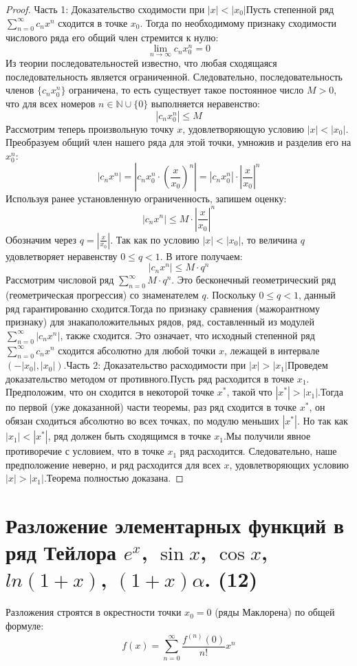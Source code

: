 \documentclass[14pt]{extreport}
\begin{document}
    \begin{proof}
        Часть 1: Доказательство сходимости при $|x| < |x_0|$Пусть степенной ряд $\sum_{n=0}^{\infty} c_n x^n$ сходится в точке $x_0$. Тогда по необходимому признаку сходимости числового ряда его общий член стремится к нулю:$$\lim_{n \to \infty} c_n x_0^n = 0$$Из теории последовательностей известно, что любая сходящаяся последовательность является ограниченной. Следовательно, последовательность членов $\{c_n x_0^n\}$ ограничена, то есть существует такое постоянное число $M > 0$, что для всех номеров $n \in \mathbb{N} \cup \{0\}$ выполняется неравенство:$$|c_n x_0^n| \le M$$Рассмотрим теперь произвольную точку $x$, удовлетворяющую условию $|x| < |x_0|$. Преобразуем общий член нашего ряда для этой точки, умножив и разделив его на $x_0^n$:$$|c_n x^n| = \left| c_n x_0^n \cdot \left(\frac{x}{x_0}\right)^n \right| = |c_n x_0^n| \cdot \left| \frac{x}{x_0} \right|^n$$Используя ранее установленную ограниченность, запишем оценку:$$|c_n x^n| \le M \cdot \left| \frac{x}{x_0} \right|^n$$Обозначим через $q = \left| \frac{x}{x_0} \right|$. Так как по условию $|x| < |x_0|$, то величина $q$ удовлетворяет неравенству $0 \le q < 1$. В итоге получаем:$$|c_n x^n| \le M \cdot q^n$$Рассмотрим числовой ряд $\sum_{n=0}^{\infty} M \cdot q^n$. Это бесконечный геометрический ряд (геометрическая прогрессия) со знаменателем $q$. Поскольку $0 \le q < 1$, данный ряд гарантированно сходится.Тогда по признаку сравнения (мажорантному признаку) для знакаположительных рядов, ряд, составленный из модулей $\sum_{n=0}^{\infty} |c_n x^n|$, также сходится. Это означает, что исходный степенной ряд $\sum_{n=0}^{\infty} c_n x^n$ сходится абсолютно для любой точки $x$, лежащей в интервале $(-|x_0|, |x_0|)$.Часть 2: Доказательство расходимости при $|x| > |x_1|$Проведем доказательство методом от противного.Пусть ряд расходится в точке $x_1$. Предположим, что он сходится в некоторой точке $x^*$, такой что $|x^*| > |x_1|$.Тогда по первой (уже доказанной) части теоремы, раз ряд сходится в точке $x^*$, он обязан сходиться абсолютно во всех точках, по модулю меньших $|x^*|$. Но так как $|x_1| < |x^*|$, ряд должен быть сходящимся в точке $x_1$.Мы получили явное противоречие с условием, что в точке $x_1$ ряд расходится. Следовательно, наше предположение неверно, и ряд расходится для всех $x$, удовлетворяющих условию $|x| > |x_1|$.Теорема полностью доказана.
    \end{proof}
    
    \chapter{Разложение элементарных функций в ряд Тейлора $e^x$, $\sin x$, $\cos x$, $ln(1 + x)$, $(1 + x)\alpha$. (12)}
    Разложения строятся в окрестности точки $x_0 = 0$ (ряды Маклорена) по общей формуле:$$f(x) = \sum_{n=0}^{\infty} \frac{f^{(n)}(0)}{n!} x^n$$
\end{document}
